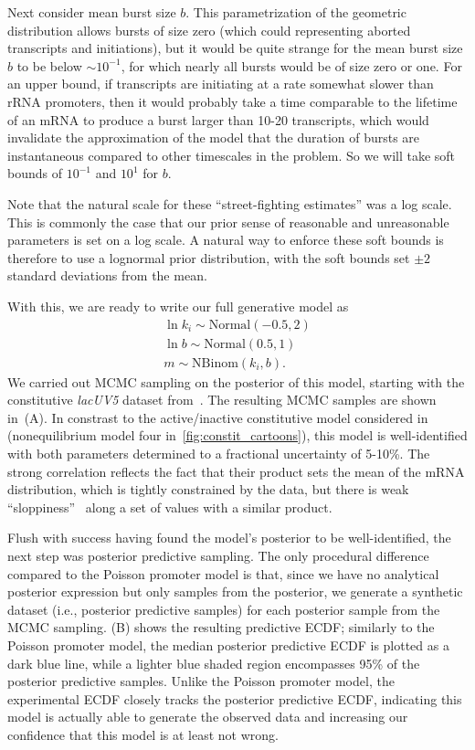 Next consider mean burst size $b$. This parametrization of the
geometric distribution allows bursts of size zero (which could
representing aborted transcripts and initiations), but it would
be quite strange for the mean burst size $b$ to be below
$\sim10^{-1}$, for which nearly all bursts would be of size zero
or one. For an upper bound, if transcripts are initiating at a
rate somewhat slower than rRNA promoters, then it would probably
take a time comparable to the lifetime of an mRNA to produce a
burst larger than 10-20 transcripts, which would invalidate the
approximation of the model that the duration of bursts are
instantaneous compared to other timescales in the problem. So we
will take soft bounds of $10^{-1}$ and $10^1$ for $b$.

Note that the natural scale for these ``street-fighting estimates''
was a log scale. This is commonly the case that our prior sense
of reasonable and unreasonable parameters is set on a log scale.
A natural way to enforce these soft bounds is therefore to use a
lognormal prior distribution, with the soft bounds set $\pm2$
standard deviations from the mean.

With this, we are ready to write our full generative model as
\begin{equation}
\begin{split}
\ln k_i \sim \text{Normal}(-0.5, 2)
\\
\ln b \sim \text{Normal}(0.5, 1)
\\
m \sim \text{NBinom}(k_i, b).
\end{split}
\end{equation}
We carried out MCMC sampling on the posterior of this model, starting
with the constitutive \textit{lacUV5} dataset from~\cite{Jones2014}.
The resulting MCMC samples are shown in~(A).
In constrast to the active/inactive constitutive model considered
in~\cite{Razo-Mejia2020} (nonequilibrium model four
in~\ref{fig:constit_cartoons}), this model is well-identified
with both parameters determined to a fractional uncertainty of 5-10\%.
The strong correlation reflects the fact that their product sets
the mean of the mRNA distribution, which is tightly constrained
by the data, but there is weak ``sloppiness''~\cite{Transtrum2015}
along a set of values with a similar product.

Flush with success having found the model's posterior to be
well-identified, the next step was posterior predictive sampling.
The only procedural difference compared to the Poisson promoter
model is that, since we have no analytical posterior expression
but only samples from the posterior, we generate a synthetic
dataset (i.e., posterior predictive samples) for each posterior
sample from the MCMC sampling. (B)
shows the resulting predictive ECDF; similarly to the Poisson
promoter model, the median posterior predictive ECDF is plotted
as a dark blue line, while a lighter blue shaded region
encompasses 95\% of the posterior predictive samples. Unlike the
Poisson promoter model, the experimental ECDF closely tracks the
posterior predictive ECDF, indicating this model is actually able
to generate the observed data and increasing our confidence that
this model is at least not wrong.

